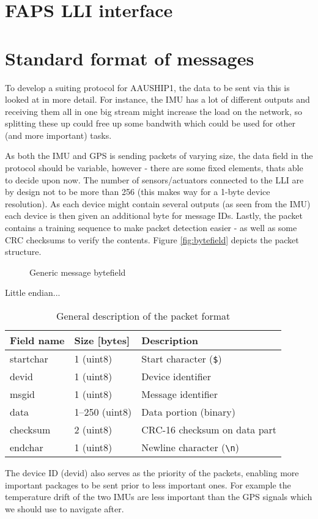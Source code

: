 
\section{FAPS LLI interface}
\section{Standard format of messages}
To develop a suiting protocol for AAUSHIP1, the data to be sent via this is looked at in more detail. For instance, the \ac{IMU} has a lot of different outputs and receiving them all in one big stream might increase the load on the network, so splitting these up could free up some bandwith which could be used for other (and more important) tasks. 

As both the \ac{IMU} and \ac{GPS} is sending packets of varying size, the data field in the protocol should be variable, however - there are some fixed elements, thats able to decide upon now. The number of sensors/actuators connected to the \ac{LLI} are by design not to be more than 256 (this makes way for a 1-byte device resolution). As each device might contain several outputs (as seen from the \ac{IMU}) each device is then given an additional byte for message IDs. Lastly, the packet contains a training sequence to make packet detection easier - as well as some \ac{CRC} checksums to verify the contents. Figure \vref{fig:bytefield} depicts the packet structure.


\begin{figure}[h]
\centering
{}
\caption{Generic message bytefield}
\label{fig:bytefield}
\end{figure}



Little endian...  

\begin{table}[htbp]
	\centering
	\begin{tabular}{lll}
		\toprule
		\textbf{Field name} & \textbf{Size [bytes]} & \textbf{Description}\\
		\midrule
		startchar & 1 (uint8) & Start character (\texttt{\$}) \\
		devid & 1 (uint8) & Device identifier \\
		msgid & 1 (uint8) & Message identifier \\
		data & 1--250 (uint8) & Data portion (binary)\\
		checksum & 2 (uint8) & CRC-16 checksum on data part \\
		endchar & 1 (uint8) & Newline character (\texttt{\textbackslash n})\\
		\bottomrule
	\end{tabular}
	\caption{General description of the packet format}
	\label{tab:general}
\end{table}

The device ID (devid) also serves as the priority of the packets, enabling more important packages to be sent prior to less important ones. For example the temperature drift of the two \ac{IMU}s are less important than the \ac{GPS} signals which we should use to navigate after. 

